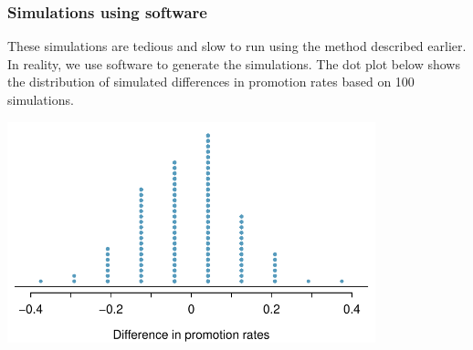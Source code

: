 
\begin{frame}
\frametitle{Simulations using software}

These simulations are tedious and slow to run using the method described earlier. In reality, we use software to generate the simulations. The dot plot below shows the distribution of simulated differences in promotion rates based on 100 simulations.

\begin{center}
\includegraphics[width=0.8\textwidth]{1-8_gender_discrimination/figures/discRandDotPlot/discRandDotPlot}
\end{center}

\end{frame}

